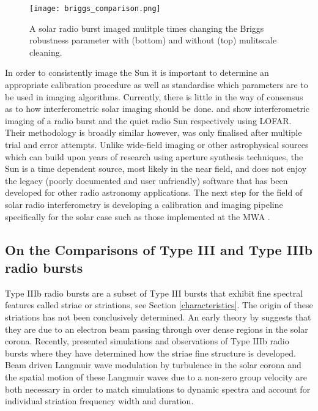 \begin{figure}[ht]
\centering
\texttt{[image: briggs\_comparison.png]}
\caption[An example of the same solar radio burst imaged with different weighting parameters.]{A solar radio burst imaged mulitple times changing the Briggs robustness parameter with (bottom) and without (top) mulitscale cleaning.}
\label{fig:briggs_comparison}
\end{figure}


In order to consistently image the Sun it is important to determine an appropriate calibration procedure as well as standardise which parameters are to be used in imaging algorithms. Currently, there is little in the way of consensus as to how interferometric solar imaging should be done. \cite{Maguire2021} and \cite{Ryan2021} show interferometric imaging of a radio burst and the quiet radio Sun respectively using LOFAR. Their methodology is broadly similar however, was only finalised after multiple trial and error attempts. Unlike wide-field imaging or other astrophysical sources which can build upon years of research using aperture synthesis techniques, the Sun is a time dependent source, most likely in the near field, and does not enjoy the legacy (poorly documented and user unfriendly) software that has been developed for other radio astronomy applications. The next step for the field of solar radio interferometry is developing a calibration and imaging pipeline specifically for the solar case such as those implemented at the MWA \citep[e.g.][]{Mondal2019}.

\subsection{On the Comparisons of Type III and Type IIIb radio bursts}
Type IIIb radio bursts are a subset of Type III bursts that exhibit fine spectral features called striae or striations, see Section \ref{characteristics}. The origin of these striations has not been conclusively determined. An early theory by \cite{Takakura1975} suggests that they are due to an electron beam passing through over dense regions in the solar corona. Recently, \cite{Reid2021} presented simulations and observations of Type IIIb radio bursts where they have determined how the striae fine structure is developed. Beam driven Langmuir wave modulation by turbulence in the solar corona and the spatial motion of these Langmuir waves due to a non-zero group velocity are both necessary in order to match simulations to dynamic spectra and account for individual striation frequency width and duration.

